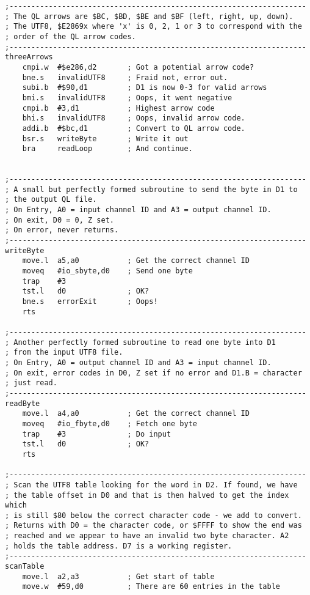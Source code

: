 \begin{lstlisting}[firstnumber=1, caption={Wolfgang's improved utf82ql Utility}]
;--------------------------------------------------------------------
; The QL arrows are $BC, $BD, $BE and $BF (left, right, up, down). 
; The UTF8, $E2869x where 'x' is 0, 2, 1 or 3 to correspond with the
; order of the QL arrow codes.
;--------------------------------------------------------------------
threeArrows
    cmpi.w  #$e286,d2       ; Got a potential arrow code?
    bne.s   invalidUTF8     ; Fraid not, error out.
    subi.b  #$90,d1         ; D1 is now 0-3 for valid arrows
    bmi.s   invalidUTF8     ; Oops, it went negative
    cmpi.b  #3,d1           ; Highest arrow code
    bhi.s   invalidUTF8     ; Oops, invalid arrow code.
    addi.b  #$bc,d1         ; Convert to QL arrow code.
    bsr.s   writeByte       ; Write it out
    bra     readLoop        ; And continue.
    

;--------------------------------------------------------------------
; A small but perfectly formed subroutine to send the byte in D1 to
; the output QL file. 
; On Entry, A0 = input channel ID and A3 = output channel ID. 
; On exit, D0 = 0, Z set.
; On error, never returns.
;--------------------------------------------------------------------
writeByte
    move.l  a5,a0           ; Get the correct channel ID
    moveq   #io_sbyte,d0    ; Send one byte
    trap    #3
    tst.l   d0              ; OK?
    bne.s   errorExit       ; Oops!
    rts

;--------------------------------------------------------------------
; Another perfectly formed subroutine to read one byte into D1
; from the input UTF8 file. 
; On Entry, A0 = output channel ID and A3 = input channel ID.
; On exit, error codes in D0, Z set if no error and D1.B = character
; just read.
;--------------------------------------------------------------------
readByte
    move.l  a4,a0           ; Get the correct channel ID
    moveq   #io_fbyte,d0    ; Fetch one byte
    trap    #3              ; Do input
    tst.l   d0              ; OK?
    rts
    
;--------------------------------------------------------------------
; Scan the UTF8 table looking for the word in D2. If found, we have
; the table offset in D0 and that is then halved to get the index which
; is still $80 below the correct character code - we add to convert.
; Returns with D0 = the character code, or $FFFF to show the end was
; reached and we appear to have an invalid two byte character. A2
; holds the table address. D7 is a working register.
;--------------------------------------------------------------------
scanTable
    move.l  a2,a3           ; Get start of table
    move.w  #59,d0          ; There are 60 entries in the table


\end{lstlisting}
